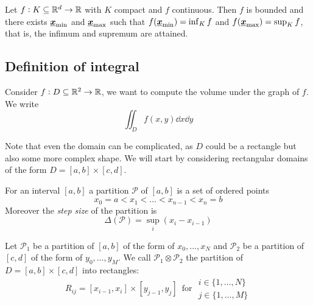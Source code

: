 \documentclass[12pt]{extarticle}
\renewcommand{\vec}[1]{\uvec{#1}}
\begin{document}
\begin{theorem}[weierstrass]
    Let $f: K \subseteq \mathbb{R}^d \to \mathbb{R}$ with $K$ compact and $f$ continuous.
    Then $f$ is bounded and there exists $\vec x_\text{min}$ and $\vec x_\text{max}$ such that $f(\vec x_\text{min}) = \inf_K f$ and $f(\vec x_\text{max}) = \sup_K f$, that is, the infimum and supremum are attained.
\end{theorem}

\subsection{Definition of integral}

Consider $f: D \subseteq \mathbb{R}^2 \to \mathbb{R}$, we want to compute the volume under the graph of $f$.
We write
\begin{equation}
    \iint_D f(x, y) \dd{x} \dd{y}
\end{equation}

Note that even the domain can be complicated, as $D$ could be a rectangle but also some more complex shape.
We will start by considering rectangular domains of the form $D = [a, b] \times [c, d]$.

\begin{definition}
    For an interval $[a, b]$ a partition $\mathcal{P}$ of $[a, b]$ is a set of ordered points
    \begin{equation}
        x_0 = a < x_1 < \dots < x_{n-1} < x_n = b
    \end{equation}
    Moreover the \emph{step size} of the partition is
    \begin{equation}
        \Delta(\mathcal{P}) = \sup_i (x_i - x_{i-1})
    \end{equation}
\end{definition}

\begin{definition}
    Let $\mathcal{P}_1$ be a partition of $[a, b]$ of the form of $x_0, \ldots, x_N$ and $\mathcal{P}_2$ be a partition of $[c, d]$ of the form of $y_0, \ldots, y_M$.
    We call $\mathcal{P}_1 \otimes \mathcal{P}_2$ the partition of $D=[a, b] \times [c, d]$ into rectangles:
    \begin{equation}
        R_{ij} = [x_{i-1}, x_i] \times [y_{j-1}, y_j] \enspace \text{for } \substack{i \in \{1, \ldots, N\} \\ j \in \{1, \ldots, M\}}
    \end{equation}
\end{definition}
\end{document}
